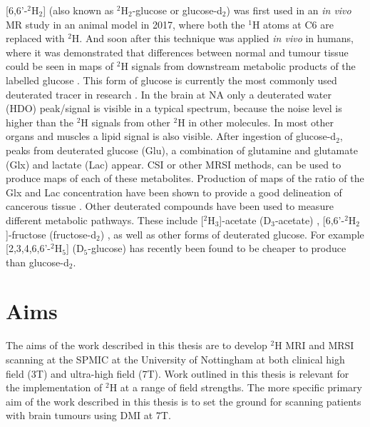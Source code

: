 [6,6'-$^2$H$_2$] (also known as $^2$H$_2$-glucose or glucose-d$_2$) was first used in an \textit{in vivo} MR study in an animal model \cite{Lu2017QuantitativeSpectroscopy} in 2017, where both the $^1$H atoms at C6 are replaced with $^2$H. And soon after this technique was applied \textit{in vivo} in humans, where it was demonstrated that differences between normal and tumour tissue could be seen in maps of $^2$H signals from downstream metabolic products of the labelled glucose \cite{DeFeyter2018DeuteriumVivo}. This form of glucose is currently the most commonly used deuterated tracer in research \cite{DeFeyter2018DeuteriumVivo,DeFeyter2021DeuteriumFuture,Ruhm2022Dynamic9.4T,Roig2022Deuterium7T,deGraaf2020OnImaging}. In the brain at \ac{NA} only a deuterated water (HDO) peak/signal is visible in a typical spectrum, because the noise level is higher than the $^2$H signals from other $^2$H in other molecules. In most other organs and muscles a lipid signal is also visible. After ingestion of glucose-d$_2$, peaks from deuterated glucose (Glu), a combination of glutamine and glutamate (Glx) and lactate (Lac) appear. \ac{CSI} or other \ac{MRSI} methods, can be used to produce maps of each of these metabolites. Production of maps of the ratio of the Glx and Lac concentration have been shown to provide a good delineation of cancerous tissue \cite{DeFeyter2018DeuteriumVivo,Straathof2021DeuteriumBrain}. Other deuterated compounds have been used to measure different metabolic pathways. These include [$^2$H$_3$]-acetate (D$_3$-acetate) \cite{DeFeyter2018DeuteriumVivo,Rich20201HVivo}, [6,6'-$^2$H$_2$]-fructose (fructose-d$_2$) \cite{Zhang202366-2H2Cancer}, as well as other forms of deuterated glucose. For example [2,3,4,6,6'-$^2$H$_5$] (D$_5$-glucose) \cite{Zou2023AImaging} has recently been found to be cheaper to produce than glucose-d$_2$.


\section{Aims}

The aims of the work described in this thesis are to develop $^2$H \ac{MRI} and \ac{MRSI} scanning at the \ac{SPMIC} at the University of Nottingham at both clinical high field (3T) and ultra-high field (7T). Work outlined in this thesis is relevant for the implementation of $^2$H at a range of field strengths. The more specific primary aim of the work described in this thesis is to set the ground for scanning patients with brain tumours using DMI at 7T.

